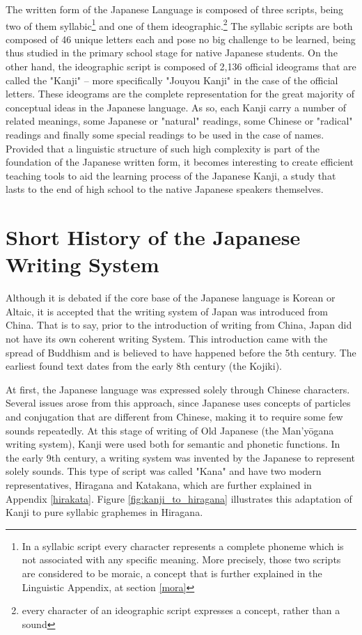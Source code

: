 The written form of the Japanese Language is composed of three scripts, being two of them syllabic\footnote{In a syllabic script every character represents a complete phoneme which is not associated with any specific meaning. More precisely, those two scripts are considered to be moraic, a concept that is further explained in the Linguistic Appendix, at section \ref{mora}} and one of them ideographic.\footnote{every character of an ideographic script expresses a concept, rather than a sound} 
The syllabic scripts are both composed of 46 unique letters each and pose no big challenge to be learned, being thus studied in the primary school stage for native Japanese students. 
On the other hand, the ideographic script is composed of 2,136 official ideograms that are called the "Kanji" – more specifically "Jouyou Kanji" in the case of the official letters. 
These ideograms are the complete representation for the great majority of conceptual ideas in the Japanese language. 
As so, each Kanji carry a number of related meanings, some Japanese or "natural" readings, some Chinese or "radical" readings and finally some special readings to be used in the case of names.
Provided that a linguistic structure of such high complexity is part of the foundation of the Japanese written form, it becomes interesting to create efficient teaching tools to aid the learning process of the Japanese Kanji, a study that lasts to the end of high school to the native Japanese speakers themselves.

\section{Short History of the Japanese Writing System} \label{japhistory}
Although it is debated if the core base of the Japanese language is Korean or Altaic, it is accepted that the writing system of Japan was introduced from China. That is to say, prior to the introduction of writing from China, Japan did not have its own coherent writing System. This introduction came with the spread of Buddhism and is believed to have happened before the 5th century. The earliest found text dates from the early 8th century (the Kojiki). 

At first, the Japanese language was expressed solely through Chinese characters.
Several issues arose from this approach, since Japanese uses concepts of particles and conjugation that are different from Chinese, making it to require some few sounds repeatedly. At this stage of writing of Old Japanese (the Man'y\={o}gana writing system), Kanji were used both for semantic and phonetic functions. In the early 9th century, a writing system was invented by the Japanese to represent solely sounds. This type of script was called "Kana" and have two modern representatives, Hiragana and Katakana, which are further explained in Appendix \ref{hirakata}. Figure \ref{fig:kanji_to_hiragana} illustrates this adaptation of Kanji to pure syllabic graphemes in Hiragana.

